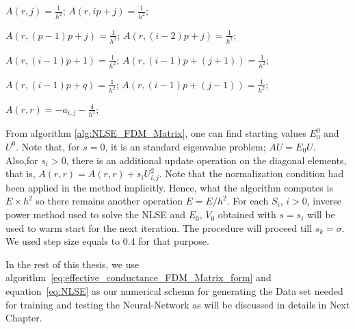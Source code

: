 \begin{algorithm}[H]
\begin{algorithmic}[1]
		
		\State $A(r, j) = \frac{1}{h^2}$;
		\Else 
		\State $A(r, ip+j) = \frac{1}{h^2}$;
		\EndIf
		

		\State $A(r, (p-1)p+j) = \frac{1}{h^2}$;
		\Else 
		\State $A(r, (i-2)p+j) = \frac{1}{h^2}$;
		\EndIf
		
		\State $A(r, (i-1)p +1) = \frac{1}{h^2}$; 
		\Else 
		\State $A(r, (i-1)p+(j+1)) = \frac{1}{h^2}$;
		\EndIf
		
		\State $A(r, (i-1)p+q) = \frac{1}{h^2}$;
		\Else 
		\State $A(r, (i-1)p+(j-1)) = \frac{1}{h^2}$;
		\EndIf
		
		\State $A(r,r) = - a_{i,j} - \frac{4}{h^2}$;
		
		\EndFor

	\end{algorithmic}
\end{algorithm}
From algorithm \eqref{alg:NLSE_FDM_Matrix}, one can find starting values $E_0^0$ and $U^0$. Note that, for $s = 0$, it is an standard eigenvalue problem; $AU = E_0U$. Also,for $s_i > 0$, there is an additional update operation on the diagonal elements, that is, $A(r,r) = A(r,r) + s_i U_{i,j}^2$. Note that the normalization condition had been applied in the method implicitly. Hence, what the algorithm computes is $E\times h^2$ so there remains another operation $E = E/h^2$. For each $S_i$, $i>0$, inverse power method used to solve the NLSE and $E_0$, $V_0$ obtained with $s=s_i$ will be used to warm start for the next iteration. The procedure will proceed till $s_k = \sigma$. We used step size equals to $0.4$ for that purpose.

In the rest of this thesis, we use algorithm~\eqref{eq:effective_conductance_FDM_Matrix_form} and equation~\eqref{eq:NLSE} as our numerical schema for generating the Data set needed for training and testing the Neural-Network as will be discussed in details in Next Chapter.

